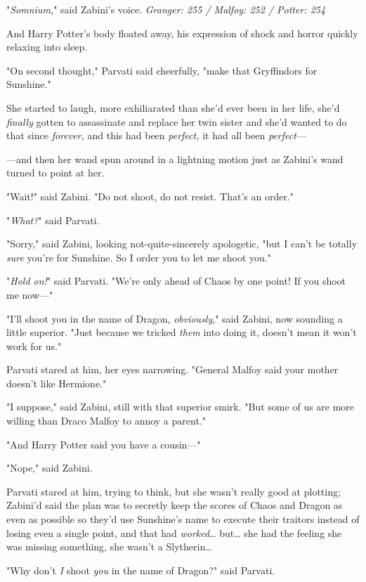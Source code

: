 "\emph{Somnium,}" said Zabini's voice.
\later
\emph{Granger: 255 / Malfoy: 252 / Potter: 254}

And Harry Potter's body floated away, his expression of shock and horror
quickly relaxing into sleep.

"On second thought," Parvati said cheerfully, "make that Gryffindors for
Sunshine."

She started to laugh, more exhiliarated than she'd ever been in her life, she'd
\emph{finally} gotten to assassinate and replace her twin sister and she'd
wanted to do that since \emph{forever,} and this had been \emph{perfect,} it
had all been \emph{perfect}---

---and then her wand spun around in a lightning motion just as Zabini's wand
turned to point at her.

"Wait!" said Zabini. "Do not shoot, do not resist. That's an order."

"\emph{What?}" said Parvati.

"Sorry," said Zabini, looking not-quite-sincerely apologetic, "but I can't be
totally \emph{sure} you're for Sunshine. So I order you to let me shoot you."

"\emph{Hold on!}" said Parvati. "We're only ahead of Chaos by one point! If you
shoot me now---"

"I'll shoot you in the name of Dragon, \emph{obviously}," said Zabini, now
sounding a little superior. "Just because we tricked \emph{them} into doing it,
doesn't mean it won't work for us."

Parvati stared at him, her eyes narrowing. "General Malfoy said your mother
doesn't like Hermione."

"I suppose," said Zabini, still with that superior smirk. "But some of us are
more willing than Draco Malfoy to annoy a parent."

"And Harry Potter said you have a cousin---"

"Nope," said Zabini.

Parvati stared at him, trying to think, but she wasn't really good at plotting;
Zabini'd said the plan was to secretly keep the scores of Chaos and Dragon as
even as possible so they'd use Sunshine's name to execute their traitors
instead of losing even a single point, and that had \emph{worked}{\ldots}
but{\ldots} she had the feeling she was missing something, she wasn't a
Slytherin{\ldots}

"Why don't \emph{I} shoot \emph{you} in the name of Dragon?" said Parvati.

